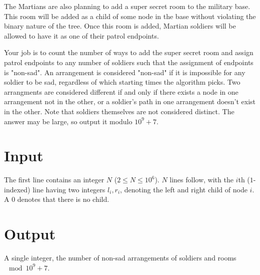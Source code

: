 The Martians are also planning to add a super secret room to the military base. This room will be added
as a child of some node in the base without violating the binary nature of the tree. Once this room is added,
Martian soldiers will be allowed to have it as one of their patrol endpoints.

Your job is to count the number of ways to add the super secret room and assign patrol endpoints to any
number of soldiers such that the assignment of endpoints is "non-sad". An arrangement is considered "non-sad"
if it is impossible for any soldier to be sad, regardless of which starting times the algorithm picks. Two
arrangments are considered different if and only if there exists a node in one arrangement not in the other,
or a soldier's path in one arrangement doesn't exist in the other. Note that soldiers themselves are not
considered distinct. The answer may be large, so output it modulo $10^9 + 7$.

\section*{Input}
The first line contains an integer $N$ ($2 \leq N \leq 10^6$).
$N$ lines follow, with the $i$th ($1$-indexed) line having two integers $l_i, r_i$, denoting the left and
right child of node $i$. A $0$ denotes that there is no child.

\section*{Output}
A single integer, the number of non-sad arrangements of soldiers and rooms $\mod 10^9 + 7$.
